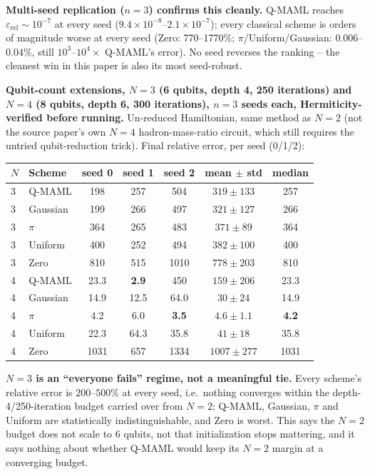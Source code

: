 \documentclass[11pt]{article}
\begin{document}
\begin{keyresult}
\textbf{Multi-seed replication ($n{=}3$) confirms this cleanly.} Q-MAML reaches
$\varepsilon_{\mathrm{rel}}\sim10^{-7}$ at every seed ($9.4\times10^{-8}$--$2.1\times10^{-7}$); every
classical scheme is orders of magnitude worse at every seed (Zero: 770--1770\%; $\pi$/Uniform/Gaussian:
$0.006$--$0.04\%$, still $10^3$--$10^4\times$ Q-MAML's error). No seed reverses the ranking -- the cleanest
win in this paper is also its most seed-robust.

\textbf{Qubit-count extensions, $N{=}3$ (6 qubits, depth 4, 250 iterations) and $N{=}4$ (8 qubits, depth
6, 300 iterations), $n{=}3$ seeds each, Hermiticity-verified before running.} Un-reduced Hamiltonian, same
method as $N{=}2$ (not the source paper's own $N{=}4$ hadron-mass-ratio circuit, which still requires the
untried qubit-reduction trick). Final relative error, per seed (0/1/2):

\begin{center}
\label{tab:su2lgt-n34}
\begin{tabular}{llccccc}
\toprule
$N$ & Scheme & seed 0 & seed 1 & seed 2 & mean $\pm$ std & median \\
\midrule
3 & Q-MAML & 198 & 257 & 504 & $319\pm133$ & 257 \\
3 & Gaussian & 199 & 266 & 497 & $321\pm127$ & 266 \\
3 & $\pi$ & 364 & 265 & 483 & $371\pm89$ & 364 \\
3 & Uniform & 400 & 252 & 494 & $382\pm100$ & 400 \\
3 & Zero & 810 & 515 & 1010 & $778\pm203$ & 810 \\
\midrule
4 & Q-MAML & 23.3 & \textbf{2.9} & 450 & $159\pm206$ & 23.3 \\
4 & Gaussian & 14.9 & 12.5 & 64.0 & $30\pm24$ & 14.9 \\
4 & $\pi$ & 4.2 & 6.0 & \textbf{3.5} & $\mathbf{4.6\pm1.1}$ & \textbf{4.2} \\
4 & Uniform & 22.3 & 64.3 & 35.8 & $41\pm18$ & 35.8 \\
4 & Zero & 1031 & 657 & 1334 & $1007\pm277$ & 1031 \\
\bottomrule
\end{tabular}
\end{center}

\textbf{$N{=}3$ is an ``everyone fails'' regime, not a meaningful tie.} Every scheme's relative error is
$200$--$500\%$ at every seed, i.e.\ nothing converges within the depth-4/250-iteration budget carried over
from $N{=}2$; Q-MAML, Gaussian, $\pi$ and Uniform are statistically indistinguishable, and Zero is worst.
This says the $N{=}2$ budget does not scale to 6 qubits, not that initialization stops mattering, and it
says nothing about whether Q-MAML would keep its $N{=}2$ margin at a converging budget.


\end{keyresult}
\end{document}
